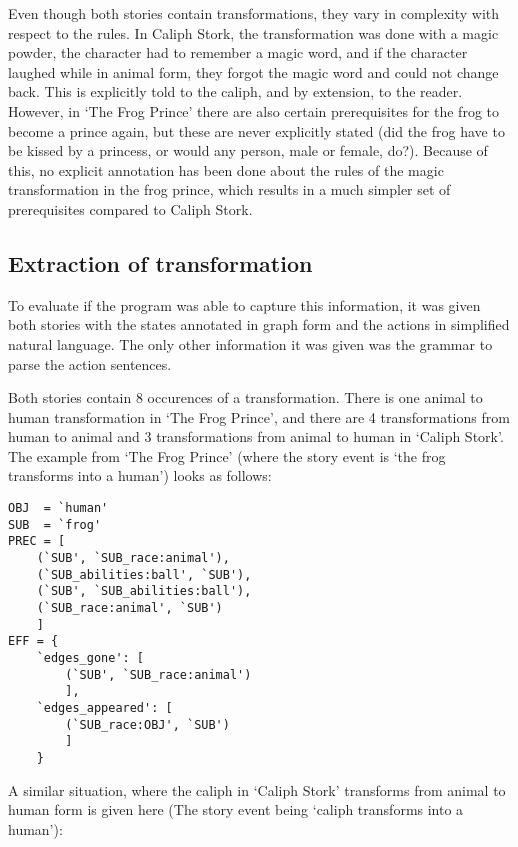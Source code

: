 Even though both stories contain transformations, they vary in complexity with
respect to the rules. In
Caliph Stork, the transformation was done with a magic powder, the character had to
remember a magic word, and if the character
laughed while in animal form, they forgot the magic word and could not change back. 
This is explicitly told to the caliph, and by extension, to the reader. 
However, in `The Frog Prince'
there are also certain prerequisites for the frog to become a prince again, but
these are never explicitly stated (did the frog have to be kissed by a princess,
or would any person, male or female, do?). Because of this, no explicit
annotation has been done about the rules of the magic transformation in the frog
prince, which results in a much simpler set of prerequisites compared to Caliph
Stork.

\subsection{Extraction of transformation}

To evaluate if the program was able to capture this information, it was given
both stories with the states annotated in graph form and the actions in
simplified natural language. The only other information it was given was the
grammar to parse the action sentences.

Both stories contain 8 occurences of a transformation. There is one animal to human
transformation in `The Frog Prince', and there are 4 transformations from human 
to animal and 3 transformations from animal to human in `Caliph Stork'.
The example from `The Frog Prince' (where the story event is `the frog
transforms into a human') looks as follows:

\begin{verbatim}
OBJ  = `human'
SUB  = `frog'
PREC = [
    (`SUB', `SUB_race:animal'),
    (`SUB_abilities:ball', `SUB'), 
    (`SUB', `SUB_abilities:ball'),
    (`SUB_race:animal', `SUB')
    ]
EFF = {
    `edges_gone': [
        (`SUB', `SUB_race:animal')
        ],
    `edges_appeared': [
        (`SUB_race:OBJ', `SUB')
        ]
    }
\end{verbatim}

A similar situation, where the caliph in `Caliph Stork' transforms from animal 
to human form is given here (The story event being `caliph transforms into a
human'):

